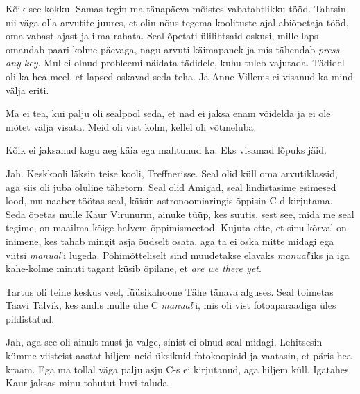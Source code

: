 
Kõik see kokku. Samas tegin ma tänapäeva 
mõistes vabatahtlikku tööd. Tahtsin nii väga olla arvutite juures, et olin nõus tegema koolituste ajal abiõpetaja tööd, 
oma vabast ajast ja ilma rahata. 
Seal õpetati ülilihtsaid oskusi, mille laps omandab paari-kolme 
päevaga, nagu arvuti käimapanek ja mis tähendab \emph{press any key}. Mul ei olnud probleemi näidata tädidele, kuhu tuleb 
vajutada. Tädidel oli ka hea meel, et lapsed oskavad seda teha. Ja Anne Villems ei visanud ka mind välja eriti. 


Ma ei tea, kui palju oli sealpool seda, et nad ei 
jaksa enam võidelda ja ei ole mõtet välja visata. Meid oli vist kolm, kellel oli võtmeluba. 


Kõik ei jaksanud kogu aeg käia ega mahtunud ka. Eks visamad lõpuks jäid. 


Jah. Keskkooli läksin teise kooli, 
Treffnerisse. Seal olid küll
oma arvutiklassid, aga siis oli juba oluline tähetorn. Seal olid Amigad, seal lindistasime esimesed lood, mu naaber töötas seal, käisin astronoomiaringis
õppisin C-d kirjutama. Seda õpetas mulle Kaur Virunurm, 
ainuke tüüp, kes suutis, sest see, mida me seal tegime, on maailma kõige halvem 
õppimismeetod. Kujuta ette, et sinu kõrval on inimene, kes tahab mingit asja 
õudselt osata, aga ta ei oska mitte midagi ega viitsi \emph{manual}'i 
lugeda. Põhimõtteliselt sind muudetakse elavaks \emph{manual}'iks ja iga kahe-kolme minuti tagant küsib õpilane, et \emph{are we there yet}.

Tartus oli teine keskus veel, füüsikahoone Tähe tänava alguses. Seal toimetas Taavi 
Talvik, kes andis mulle ühe C 
\emph{manual}'i, mis oli vist fotoaparaadiga üles pildistatud.


Jah, aga see oli ainult must ja valge, sinist ei olnud seal midagi. Lehitsesin kümme-viisteist aastat hiljem neid 
üksikuid fotokoopiaid ja vaatasin, et päris hea kraam. 
Ega ma tollal väga palju asju C-s ei kirjutanud, aga
hiljem küll. Igatahes Kaur jaksas minu tohutut huvi taluda. 

